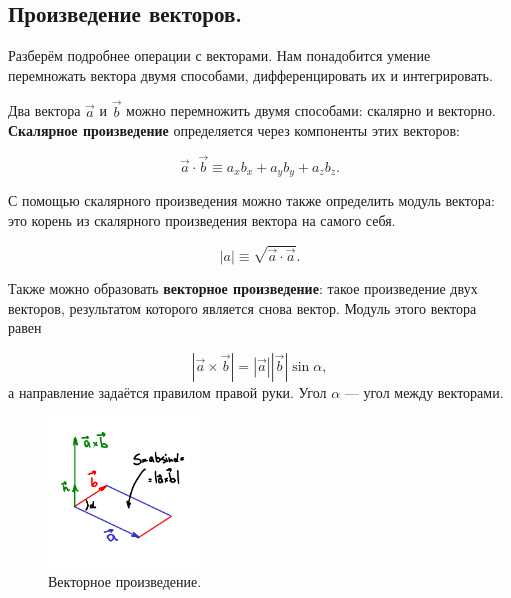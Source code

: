 \documentclass[11pt,a4paper]{article}
\numberwithin{equation}{section}
\begin{document}
\subsection{Произведение векторов.}
\label{sec:vector_product}

Разберём подробнее операции с векторами. Нам понадобится умение
перемножать вектора двумя способами, дифференцировать их и
интегрировать. 

Два вектора $\vec{a}$ и $\vec{b}$ можно перемножить двумя способами:
скалярно и векторно. \textbf{Скалярное произведение} определяется через
компоненты этих векторов:

\begin{equation}
  \label{eq:def_scalar_product}
  \vec{a} \cdot \vec{b} \equiv a_x b_x + a_y b_y + a_z b_z.
\end{equation}

С помощью скалярного произведения можно также определить модуль
вектора: это корень из скалярного произведения вектора на самого себя.

\begin{equation}
  \label{eq:def_modulus_vector}
  |a| \equiv \sqrt{\vec{a} \cdot \vec{a}}.
\end{equation}

Также можно образовать \textbf{векторное произведение}: такое
произведение двух векторов, результатом которого является снова
вектор. Модуль этого вектора равен

\begin{equation}
  \label{eq:def_cross_product}
  | \vec{a} \times \vec{b}| = |\vec{a}| |\vec{b}| \sin \alpha,  
\end{equation}
а направление задаётся правилом правой руки. Угол $\alpha$ --- угол
между векторами. 

\begin{figure}
  \vspace{-1.5cm}
  \begin{center}
    \includegraphics[width=4cm,height=4cm]{cross.pdf}
  \end{center}
  \vspace{-0.7cm}
  \caption{Векторное произведение.}
  \label{fig:curl}
  \vspace{-1cm}
\end{figure}
\end{document}
